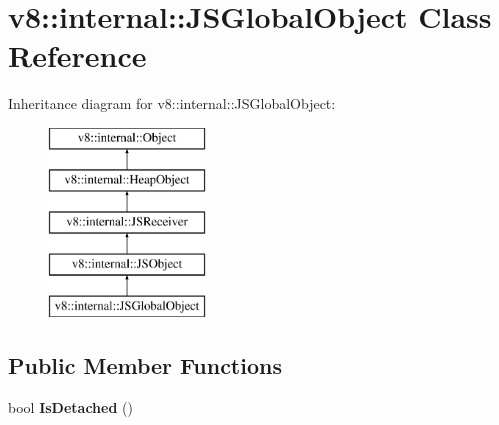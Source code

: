\hypertarget{classv8_1_1internal_1_1_j_s_global_object}{}\section{v8\+:\+:internal\+:\+:J\+S\+Global\+Object Class Reference}
\label{classv8_1_1internal_1_1_j_s_global_object}
Inheritance diagram for v8\+:\+:internal\+:\+:J\+S\+Global\+Object\+:\begin{figure}[H]
\begin{center}
\leavevmode
\includegraphics[height=5.000000cm]{classv8_1_1internal_1_1_j_s_global_object}
\end{center}
\end{figure}
\subsection*{Public Member Functions}
\begin{DoxyCompactItemize}
\item 
bool {\bfseries Is\+Detached} ()\hypertarget{classv8_1_1internal_1_1_j_s_global_object_a9c78fdab942887837ce802a9f466c10f}{}\label{classv8_1_1internal_1_1_j_s_global_object_a9c78fdab942887837ce802a9f466c10f}

\end{DoxyCompactItemize}
